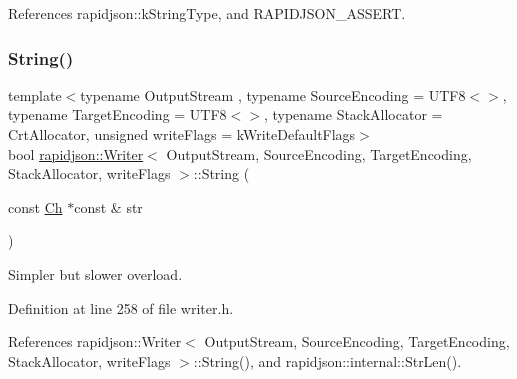 References rapidjson\+::k\+String\+Type, and R\+A\+P\+I\+D\+J\+S\+O\+N\+\_\+\+A\+S\+S\+E\+RT.

\mbox{\label{classrapidjson_1_1_writer_a849e2b675a2b868699a14d45c7396f24}} 
\subsubsection{\texorpdfstring{String()}{String()}\hspace{0.1cm}{\footnotesize\ttfamily [2/2]}}
{\footnotesize\ttfamily template$<$typename Output\+Stream , typename Source\+Encoding  = U\+T\+F8$<$$>$, typename Target\+Encoding  = U\+T\+F8$<$$>$, typename Stack\+Allocator  = Crt\+Allocator, unsigned write\+Flags = k\+Write\+Default\+Flags$>$ \\
bool \mbox{\hyperlink{classrapidjson_1_1_writer}{rapidjson\+::\+Writer}}$<$ Output\+Stream, Source\+Encoding, Target\+Encoding, Stack\+Allocator, write\+Flags $>$\+::String (\begin{DoxyParamCaption}\item[{const \mbox{\hyperlink{classrapidjson_1_1_writer_a2cf973937ca1110293bf1350fac2a6d6}{Ch}} $\ast$const \&}]{str }\end{DoxyParamCaption})}



Simpler but slower overload. 



Definition at line 258 of file writer.\+h.


\begin{DoxyCode}{0}

\end{DoxyCode}


References rapidjson\+::\+Writer$<$ Output\+Stream, Source\+Encoding, Target\+Encoding, Stack\+Allocator, write\+Flags $>$\+::\+String(), and rapidjson\+::internal\+::\+Str\+Len().




